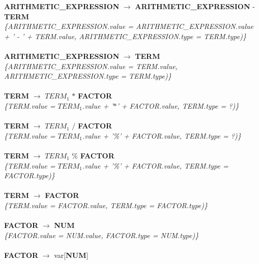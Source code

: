 \documentclass[10pt,a4paper]{article}
\begin{document}
\textbf{ARITHMETIC\_EXPRESSION} $\rightarrow$ \textbf{ARITHMETIC\_EXPRESSION} - \textbf{TERM}  \\

\textit{\{ARITHMETIC\_EXPRESSION.value =  ARITHMETIC\_EXPRESSION.value + ' - ' + TERM.value, ARITHMETIC\_EXPRESSION.type = TERM.type)\}}  \\ \\


\textbf{ARITHMETIC\_EXPRESSION} $\rightarrow$ \textbf{TERM} \\

\textit{\{ARITHMETIC\_EXPRESSION.value = TERM.value, ARITHMETIC\_EXPRESSION.type = TERM.type)\}}  \\ \\


\textbf{TERM} $\rightarrow$ \textbf{$TERM_{1}$} $*$ \textbf{FACTOR}   \\

\textit{\{TERM.value = $TERM_{1}$.value + '$*$' + FACTOR.value, TERM.type = ?)\}}  \\ \\


\textbf{TERM} $\rightarrow$ \textbf{$TERM_{1}$} $/$ \textbf{FACTOR}   \\

\textit{\{TERM.value = $TERM_{1}$.value + '\%' + FACTOR.value, TERM.type = ?)\}}  \\ \\


\textbf{TERM} $\rightarrow$ \textbf{$TERM_{1}$} \% \textbf{FACTOR}  \\

\textit{\{TERM.value = $TERM_{1}$.value + '\%' + FACTOR.value, TERM.type = FACTOR.type)\}}  \\ \\


\textbf{TERM} $\rightarrow$ \textbf{FACTOR} \\

\textit{\{TERM.value = FACTOR.value, TERM.type = FACTOR.type)\}}  \\ \\


\textbf{FACTOR} $\rightarrow$ \textbf{NUM}   \\

\textit{\{FACTOR.value = NUM.value, FACTOR.type = NUM.type)\}}  \\ \\


\textbf{FACTOR} $\rightarrow$ var[\textbf{NUM}]  \\ 
\end{document}
